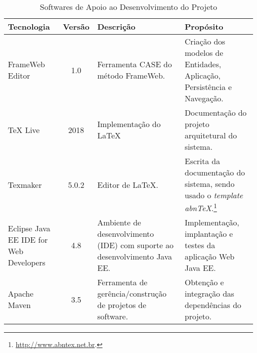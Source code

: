 \begin{table}[h]
	\centering	
	\vspace{0.5cm}
	\caption{Softwares de Apoio ao Desenvolvimento do Projeto}	
	\label{tabela-software}
	\begin{tabular}{|p{3cm}|c|p{5cm}|p{6cm}|}  \hline 
	
 		\rowcolor[rgb]{0.8,0.8,0.8} Tecnologia & Versão & Descrição & Propósito \\\hline 
 		 
		FrameWeb Editor & 1.0 & Ferramenta CASE do método FrameWeb. & Criação dos modelos de Entidades, Aplicação, Persistência e Navegação. \\\hline

		TeX Live  & 2018 & Implementação do \LaTeX & Documentação do projeto arquitetural do sistema. \\\hline       
		
		Texmaker & 5.0.2 & Editor de \LaTeX. &  Escrita da documentação do sistema, sendo usado o \textit{template} \textit{abnTeX}.\footnote{\url{http://www.abntex.net.br}.} \\\hline    

		Eclipse Java EE IDE for Web Developers & 4.8 & Ambiente de desenvolvimento (IDE) com suporte ao desenvolvimento Java EE. & Implementação, implantação e testes da aplicação Web Java EE. \\\hline 
		
		Apache Maven & 3.5 & Ferramenta de gerência/construção de projetos de software. & Obtenção e integração das dependências do projeto. \\\hline
	\end{tabular}
\end{table}

